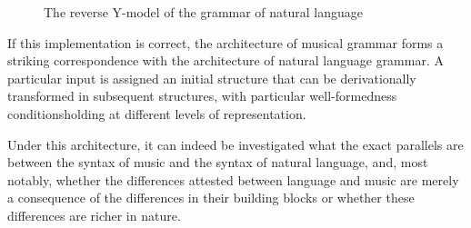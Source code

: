 \documentclass[output=paper]{langsci/langscibook}
\begin{document}
\begin{figure}
\begin{floatrow}
  \captionsetup{margin=.05\linewidth}
    {\caption{\label{bkm:Ref348624990} (reverse reverse) Y-model of the grammar of music}}
    {\caption{\label{fig:26.6} The reverse Y-model of the grammar of natural language}}
\end{floatrow}
\end{figure}

If this implementation is correct, the architecture of musical grammar forms a
striking correspondence with the architecture of natural language grammar. A
particular input is assigned an initial structure that can be derivationally
transformed in subsequent structures, with particular well-formedness
conditions\linebreak holding at different levels of representation.

Under this architecture, it can indeed be investigated what the exact parallels
are between the syntax of music and the syntax of natural language, and, most
notably, whether the differences attested between language and music are merely
a consequence of the differences in their building blocks or whether these
differences are richer in nature.
\end{document}
